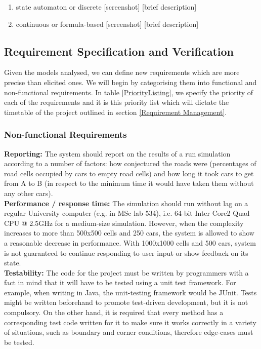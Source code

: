 \documentclass{article}
\begin{document}
\begin{enumerate}
	
	\item state automaton or discrete
	[screenshot] [brief description]
	\item continuous or formula-based
	[screenshot] [brief description]

\end{enumerate}

\subsection{Requirement Specification and Verification}

Given the models analysed, we can define new requirements which are more precise than elicited ones. We will begin by categorising them into functional and non-functional requirements. In table \ref{PriorityListing}, we specify the priority of each of the requirements and it is this priority list which will dictate the timetable of the project outlined in section \ref{Requirement Management}.\\

\subsubsection{Non-functional Requirements}
\textbf{Reporting:} The system should report on the results of a run simulation according to a number of factors: how conjectured the roads were (percentages of road cells occupied by cars to empty road cells) and how long it took cars to get from A to B (in respect to the minimum time it would have taken them without any other cars).\\

\noindent
\textbf{Performance / response time:} The simulation should run without lag on a regular University computer (e.g. in MSc lab 534), i.e. 64-bit Inter Core2 Quad CPU @ 2.5GHz for a medium-size simulation. However, when the complexity increases to more than 500x500 cells and 250 cars, the system is allowed to show a reasonable decrease in performance. With 1000x1000 cells and 500 cars, system is not guaranteed to continue responding to user input or show feedback on its state.\\

\noindent
\textbf{Testability:} The code for the project must be written by programmers with a fact in mind that it will have to be tested using a unit test framework. For example, when writing in Java, the unit-testing framework would be JUnit. Tests might be written beforehand to promote test-driven development, but it is not compulsory. On the other hand, it is required that every method has a corresponding test code written for it to make sure it works correctly in a variety of situations, such as boundary and corner conditions, therefore edge-cases must be tested.\\
\end{document}
